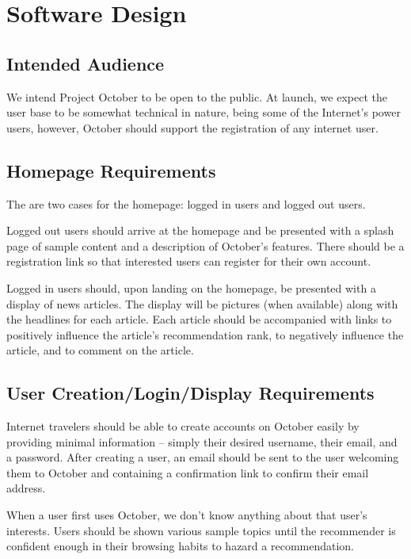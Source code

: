 \documentclass[11pt,letterpaper]{article}
\begin{document}
\section{Software Design}

\subsection{Intended Audience}
We intend Project October to be open to the public.
At launch, we expect the user base to be somewhat technical in nature, being some of the Internet's power users, however, October should support the registration of any internet user.

\subsection{Homepage Requirements}
The are two cases for the homepage: logged in users and logged out users.

Logged out users should arrive at the homepage and be presented with a splash page of sample content and a description of October's features.
There should be a registration link so that interested users can register for their own account.

Logged in users should, upon landing on the homepage, be presented with a display of news articles.
The display will be pictures (when available) along with the headlines for each article.
Each article should be accompanied with links to positively influence the article's recommendation rank, to negatively influence the article, and to comment on the article.

\subsection{User Creation/Login/Display Requirements}
Internet travelers should be able to create accounts on October easily by providing minimal information -- simply their desired username, their email, and a password.
After creating a user, an email should be sent to the user welcoming them to October and containing a confirmation link to confirm their email address.

When a user first uses October, we don't know anything about that user's interests. Users should be shown various sample topics until the recommender is confident enough in their browsing habits to hazard a recommendation.
\end{document}
